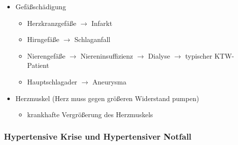 \begin{itemize}
    \item Gefäßschädigung
    \begin{itemize}
        \item Herzkranzgefäße ${\rightarrow}$ Infarkt
        \item Hirngefäße ${\rightarrow}$ Schlaganfall
        \item Nierengefäße ${\rightarrow}$ Niereninsuffizienz ${\rightarrow}$
        Dialyse ${\rightarrow}$ typischer KTW-Patient
        \item Hauptschlagader ${\rightarrow}$ Aneurysma        
    \end{itemize}
    \item Herzmuskel (Herz muss gegen größeren Widerstand pumpen)
    \begin{itemize}
        \item krankhafte Vergrößerung des Herzmuskels
    \end{itemize}
\end{itemize}

\subsubsection{Hypertensive Krise und Hypertensiver Notfall}

